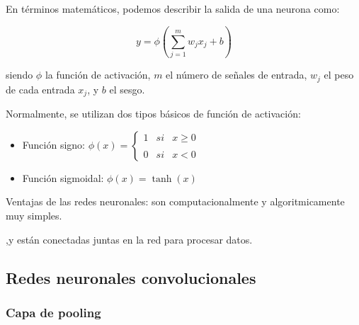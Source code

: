 En términos matemáticos, podemos describir la salida de una neurona como:

\begin{equation}
	y = \phi(\sum_{j=1}^{m} w_j x_j + b)
\end{equation}

siendo $\phi$ la función de activación, $m$ el número de señales de entrada, $w_j$ el peso de cada entrada $x_j$, y $b$ el sesgo.

Normalmente, se utilizan dos tipos básicos de función de activación:

\begin{itemize}
	\item Función signo:
	$\phi(x)= \left\{ \begin{array}{lcc} 1 & si & x \geq 0 \\ \\ 0 & si & x < 0 \end{array} \right.$
	\item Función sigmoidal:
	$\phi(x)= \tanh(x)$
\end{itemize} 

Ventajas de las redes neuronales: son computacionalmente y algoritmicamente muy simples.

,y están conectadas juntas en la red para procesar datos.


\subsection{Redes neuronales convolucionales}


\subsubsection*{Capa de pooling}